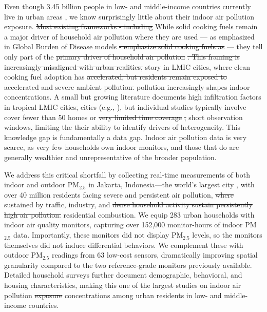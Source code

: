 \documentclass[9pt,twocolumn,twoside]{pnas-new}
\providecommand{\DIFadd}[1]{{\protect\color{red}#1}}
\providecommand{\DIFdel}[1]{{\protect\color{red}\protect\sout{#1}}}
\begin{document}
Even though 3.45 billion people in low- and middle-income countries currently live in urban areas \citep{noauthor_urban_2023}, we know surprisingly little about their indoor air pollution exposure. \DIFdel{Most existing frameworks - including} \DIFadd{While solid cooking fuels remain a major driver of household air pollution where they are used --- as emphasized in} Global Burden of Disease models \DIFdel{- emphasize solid cooking fuels as} \DIFadd{\citep{bennitt_global_2025} --- they tell only part of} the \DIFdel{primary driver of household air pollution} {\protect\color{red}\citep{bennitt_global_2025}}\DIFdel{. This framing is increasingly misaligned with urban realities,} \DIFadd{story in LMIC cities,} where clean cooking fuel adoption has \DIFdel{accelerated, but residents remain exposed to} \DIFadd{accelerated and} severe ambient \DIFdel{pollution.} \DIFadd{pollution increasingly shapes indoor concentrations.}
A small but growing literature documents high infiltration factors in tropical LMIC \DIFdel{cities,} \DIFadd{cities (e.g., \cite{Sahaetal2025, GURLEY201311, Anandetal2022, Hossainetal2021, KAJJOBA20244184, zhou2011household, kephart2020indoor, fandino2020household}),} but \DIFadd{individual} studies typically \DIFdel{involve} \DIFadd{cover} fewer than 50 homes or \DIFdel{very limited time coverage} {\protect\color{red}\citep{Sahaetal2025, GURLEY201311, Anandetal2022, Hossainetal2021, KAJJOBA20244184, zhou2011household, kephart2020indoor, fandino2020household}}\DIFdel{,} \DIFadd{short observation windows,} limiting \DIFdel{the} \DIFadd{their} ability to identify drivers of heterogeneity. This knowledge gap is fundamentally a data gap. Indoor air pollution data is very scarce, as very few households own indoor monitors, and those that do are generally wealthier and unrepresentative of the broader population. 

We address this critical shortfall by collecting real-time measurements of both indoor and outdoor PM$_{2.5}$ in Jakarta, Indonesia—the world's largest city \citep{undesa2025wup}, with over 40 million residents facing severe and persistent air pollution, \DIFdel{where} \DIFadd{sustained by} traffic, industry, and \DIFdel{dense household activity sustain persistently high air pollution.} \DIFadd{residential combustion.} We equip 283 urban households with indoor air quality monitors, capturing over 152,000 monitor-hours of indoor PM$_{2.5}$ data. Importantly, these monitors did not display PM$_{2.5}$ levels, so the monitors themselves did not induce differential behaviors. We complement these with outdoor PM$_{2.5}$ readings from 63 low-cost sensors, dramatically improving spatial granularity compared to the two reference-grade monitors previously available. Detailed household surveys further document demographic, behavioral, and housing characteristics, making this one of the largest studies on indoor air pollution \DIFdel{exposure} \DIFadd{concentrations} among urban residents in low- and middle-income countries. 
\end{document}

